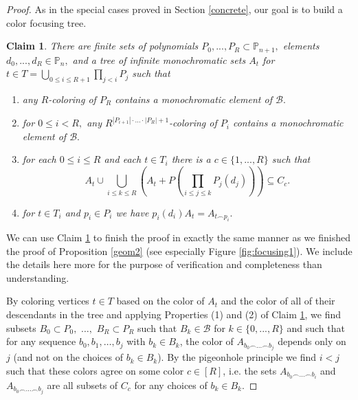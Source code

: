 \documentclass[10pt,a4paper]{article}
\newtheorem{claim}[theorem]{Claim}
\theoremstyle{definition}
\begin{document}
\begin{proof}


As in the special cases proved in Section \ref{concrete}, our goal is to build a color focusing tree.

\begin{claim}\label{geo}
There are finite sets of polynomials $P_0,...,P_R\subset \mathbb{P}_{n+1},$ elements $d_0,...,d_R\in \mathbb{P}_n,$ and a tree of infinite monochromatic sets $A_t$ for $t\in T=\bigcup_{0\leq i\leq R+1}\prod_{j<i}P_{j}$ such that

\begin{enumerate}
    \item any $R$-coloring of ${P}_{R}$ contains a monochromatic element of $\mathcal{B}.$
    \item for $0\leq i<R,$ any $R^{|P_{i+1}|\cdot...\cdot|P_R|+1}$-coloring of $P_i$ contains a monochromatic element of $\mathcal{B}.$
    \item  for each $0\leq i\leq R$ and each $t\in T_i$ there is a $c\in \{1,...,R\}$ such that $$A_t\cup\bigcup_{i\leq k\leq R}(A_t+P(\prod_{i\leq j\leq k}P_j(d_j)))\subseteq C_c.$$
    \item for $t\in T_i$ and $p_i\in P_i$ we have $p_i(d_i)A_t=A_{t\smallfrown p_i}.$
\end{enumerate}
\end{claim}

We can use Claim \ref{geo} to finish the proof in exactly the same manner as we finished the proof of Proposition \ref{geom2} (see especially Figure \ref{fig:focusing1}).  We include the details here more for the purpose of verification and completeness than understanding.

By coloring vertices $t\in T$ based on the color of $A_t$ and the color of all of their descendants in the tree and applying Properties (1) and (2) of Claim \ref{geo}, we find subsets $B_0\subset P_0,$ $\ldots,$ $B_R\subset P_R$ such that $B_k\in\mathcal{B}$ for $k\in \{0,...,R\}$ and such that for any sequence $b_0,b_1,\ldots, b_j$ with $b_k\in B_k$, the color of $A_{b_0\smallfrown...\smallfrown b_j}$ depends only on $j$ (and not on the choices of $b_k\in B_k$).  By the pigeonhole principle we find $i<j$ such that these colors agree on some color $c\in [R]$, i.e. the sets $A_{b_0\smallfrown...\smallfrown b_i}$ and $A_{b_0\smallfrown...\smallfrown b_j}$ are all subsets of $C_c$ for any choices of $b_k\in B_k$.  


\end{proof}
\end{document}
